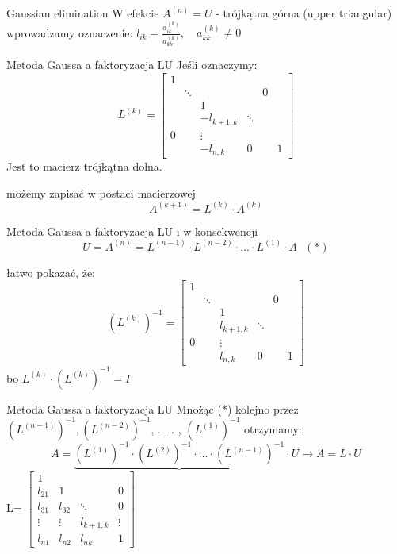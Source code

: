 \begin{frame}{Gaussian elimination}
W efekcie $A^{(n)}=U$ - trójkątna górna (upper triangular) \\
wprowadzamy oznaczenie: $l_{ik}=\displaystyle \frac{a_{ik}^{(k)}}{a_{kk}^{(k)}}, \quad a_{kk}^{(k)}\neq 0 $
\end{frame}
\begin{frame}{Metoda Gaussa a faktoryzacja LU}
Jeśli oznaczymy:
$$
L^{(k)}=\begin{bmatrix}
1 \\
 & \ddots & & & 0 \\
 & & 1\\
 & &   -l_{k+1,k}  & \ddots\\
 0 & &  \vdots &\\
 & & -l_{n,k} &  0  & & 1

\end{bmatrix}
$$
Jest to macierz trójkątna dolna.

 możemy zapisać w postaci macierzowej
$$
A^{(k+1)}=L^{(k)}\cdot A^{(k)}
$$



\end{frame}
\begin{frame}{Metoda Gaussa a faktoryzacja LU}
i w konsekwencji
$$
U=A^{(n)}=L^{(n-1)}\cdot L^{(n-2)}\cdot\ldots\cdot L^{(1)}\cdot A \ \ \ (*)
$$

łatwo pokazać, że:
$$
(L^{(k)})^{-1}=\begin{bmatrix}
1 \\
 & \ddots & & & 0 \\
 & & 1\\
 & &   l_{k+1,k}  & \ddots\\
 0 & &  \vdots \\
 & & l_{n,k} &  0  & & 1

\end{bmatrix}
$$
bo $L^{(k)}\cdot(L^{(k)})^{-1}=I$
\end{frame}
\begin{frame}{Metoda Gaussa a faktoryzacja LU}
Mnożąc (*) kolejno przez $(L^{(n-1)})^{-1}, (L^{(n-2)})^{-1}$, . . . , $(L^{(1)})^{-1}$ otrzymamy:
$$
A=\underbrace{(L^{(1)})^{-1}\cdot(L^{(2)})^{-1}\cdot\ldots\cdot(L^{(n-1)})^{-1}}\cdot U\rightarrow A=L\cdot U
$$
\hspace{17mm}
L=
$
\begin{bmatrix}
1 & & & \\
l_{21}  & 1 & & 0 \\
l_{31} & l_{32} & \ddots & 0 \\
\vdots & \vdots & l_{k+1,k} & \vdots \\
l_{n1} & l_{n2} & l_{nk} & 1
\end{bmatrix}
$
\end{frame}
